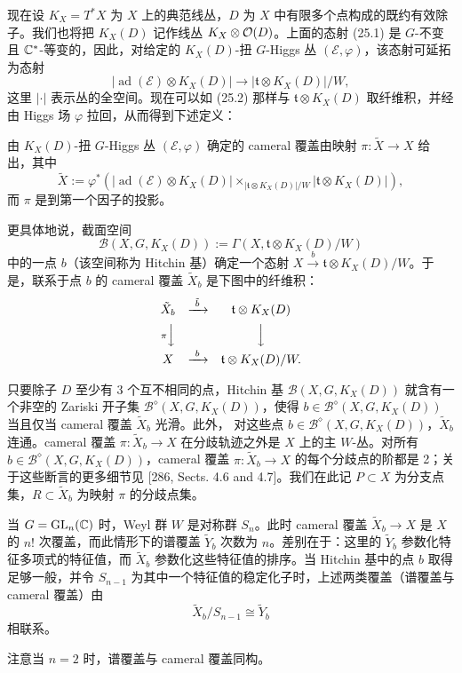 现在设 $K_X=T^*X$ 为 $X$ 上的典范线丛，$D$ 为 $X$ 中有限多个点构成的既约有效除子。我们也将把 $K_X(D)$ 记作线丛 $K_X\otimes\mathcal{O}(D)$。上面的态射 (25.1) 是 $G$-不变且 $\mathbb{C}^*$-等变的，因此，对给定的 $K_X(D)$-扭 $G$-Higgs 丛 $(\mathcal{E},\varphi)$，该态射可延拓为态射
\[
|\operatorname{ad}(\mathcal{E})\otimes K_X(D)|\to|\mathfrak{t}\otimes K_X(D)|/W,
\]
这里 $|\cdot|$ 表示丛的全空间。现在可以如 (25.2) 那样与 $\mathfrak{t}\otimes K_X(D)$ 取纤维积，并经由 Higgs 场 $\varphi$ 拉回，从而得到下述定义：

\begin{definition}[25.3] 由 $K_X(D)$-扭 $G$-Higgs 丛 $(\mathcal{E},\varphi)$ 确定的 cameral 覆盖由映射 $\pi:\tilde X\to X$ 给出，其中
\[
\tilde X:=\varphi^*\left(|\operatorname{ad}(\mathcal{E})\otimes K_X(D)|\times_{|\mathfrak{t}\otimes K_X(D)|/W}|\mathfrak{t}\otimes K_X(D)|\right),
\]
而 $\pi$ 是到第一个因子的投影。\end{definition}

更具体地说，截面空间
\[
\mathcal{B}(X,G,K_X(D)):=\Gamma(X,\mathfrak{t}\otimes K_X(D)/W)
\]
中的一点 $b$（该空间称为 Hitchin 基）确定一个态射 $X\xrightarrow{b}\mathfrak{t}\otimes K_X(D)/W$。于是，联系于点 $b$ 的 cameral 覆盖 $\tilde X_b$ 是下图中的纤维积：
\[
\begin{array}{ccc}
\tilde X_b & \xrightarrow{\ \tilde b\ } & \mathfrak{t}\otimes K_X(D)\\[5pt]
{\scriptstyle \pi}\Big\downarrow & & \Big\downarrow\\[5pt]
X & \xrightarrow{\ b\ } & \mathfrak{t}\otimes K_X(D)/W .
\end{array}
\]

只要除子 $D$ 至少有 3 个互不相同的点，Hitchin 基 $\mathcal{B}(X,G,K_X(D))$ 就含有一个非空的 Zariski 开子集 $\mathcal{B}^{\diamond}(X,G,K_X(D))$，使得 $b\in\mathcal{B}^{\diamond}(X,G,K_X(D))$ 当且仅当 cameral 覆盖 $\tilde X_b$ 光滑。此外，
对这些点 $b\in\mathcal{B}^{\diamond}(X,G,K_X(D))$，$\tilde X_b$ 连通。cameral 覆盖 $\pi:\tilde X_b\to X$ 在分歧轨迹之外是 $X$ 上的主 $W$-丛。对所有 $b\in\mathcal{B}^{\diamond}(X,G,K_X(D))$，cameral 覆盖 $\pi:\tilde X_b\to X$ 的每个分歧点的阶都是 2；关于这些断言的更多细节见 [286, Sects. 4.6 and 4.7]。我们在此记 $P\subset X$ 为分支点集，$R\subset\tilde X_b$ 为映射 $\pi$ 的分歧点集。

\begin{example}[25.4] 当 $G=\operatorname{GL}_n(\mathbb{C})$ 时，Weyl 群 $W$ 是对称群 $S_n$。此时 cameral 覆盖 $\tilde X_b\to X$ 是 $X$ 的 $n!$ 次覆盖，而此情形下的谱覆盖 $\tilde Y_b$ 次数为 $n$。差别在于：这里的 $\tilde Y_b$ 参数化特征多项式的特征值，而 $\tilde X_b$ 参数化这些特征值的排序。当 Hitchin 基中的点 $b$ 取得足够一般，并令 $S_{n-1}$ 为其中一个特征值的稳定化子时，上述两类覆盖（谱覆盖与 cameral 覆盖）由
\[
\tilde X_b/S_{n-1}\cong\tilde Y_b
\]
相联系。

注意当 $n=2$ 时，谱覆盖与 cameral 覆盖同构。\end{example}

